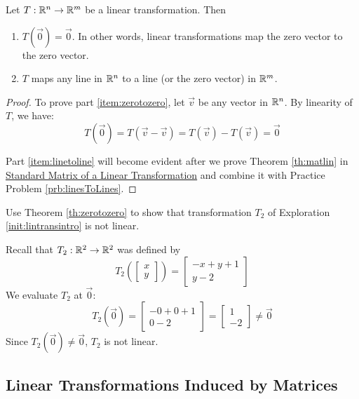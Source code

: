 \documentclass{ximera}
\begin{document}
\begin{theorem}\label{th:zerotozero} Let $T:\mathbb{R}^n\rightarrow \mathbb{R}^m$ be a linear transformation.  Then 
\begin{enumerate}
\item\label{item:zerotozero}
$T(\vec{0})=\vec{0}$.  In other words, linear transformations map the zero vector to the zero vector.
\item\label{item:linetoline}
$T$ maps any line in $\mathbb{R}^n$ to a line (or the zero vector) in $\mathbb{R}^m$.
\end{enumerate}
\end{theorem}
\begin{proof}
To prove part \ref{item:zerotozero}, let $\vec{v}$ be any vector in $\mathbb{R}^n$.  By linearity of $T$, we have:
$$T(\vec{0})=T(\vec{v}-\vec{v})=T(\vec{v})-T(\vec{v})=\vec{0}$$

Part \ref{item:linetoline} will become evident after we prove Theorem \ref{th:matlin} in \href{https://ximera.osu.edu/oerlinalg/LinearAlgebra/LTR-0020/main}{Standard Matrix of a Linear Transformation} and combine it with Practice Problem \ref{prb:linesToLines}.
\end{proof}

\begin{example}\label{ex:zerotozero}
Use Theorem \ref{th:zerotozero} to show that transformation $T_2$ of Exploration \ref{init:lintransintro} is not linear.
\begin{explanation}
Recall that $T_2:\mathbb{R}^2\rightarrow\mathbb{R}^2$ was defined by
$$T_2\left(\begin{bmatrix}
x\\
y
\end{bmatrix}\right)=\begin{bmatrix}
-x+y+1\\
y-2
\end{bmatrix}$$
We evaluate $T_2$ at $\vec{0}$:
$$T_2(\vec{0})=\begin{bmatrix}
-0+0+1\\
0-2
\end{bmatrix}=\begin{bmatrix}1\\-2\end{bmatrix}\neq\vec{0}$$
Since $T_2(\vec{0})\neq\vec{0}$, $T_2$ is not linear.
\end{explanation}
\end{example}




\subsection*{Linear Transformations Induced by Matrices}
\end{document}
